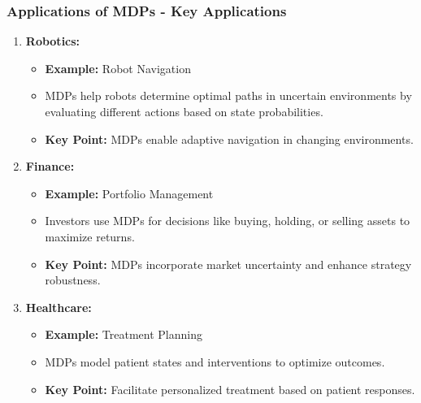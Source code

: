 \documentclass[aspectratio=169]{beamer}
\begin{document}
\begin{frame}[fragile]
    \frametitle{Applications of MDPs - Key Applications}
    \begin{enumerate}
        \item \textbf{Robotics:}
            \begin{itemize}
                \item \textbf{Example:} Robot Navigation
                \item MDPs help robots determine optimal paths in uncertain environments by evaluating different actions based on state probabilities.
                \item \textbf{Key Point:} MDPs enable adaptive navigation in changing environments.
            \end{itemize}

        \item \textbf{Finance:}
            \begin{itemize}
                \item \textbf{Example:} Portfolio Management
                \item Investors use MDPs for decisions like buying, holding, or selling assets to maximize returns.
                \item \textbf{Key Point:} MDPs incorporate market uncertainty and enhance strategy robustness.
            \end{itemize}

        \item \textbf{Healthcare:}
            \begin{itemize}
                \item \textbf{Example:} Treatment Planning
                \item MDPs model patient states and interventions to optimize outcomes.
                \item \textbf{Key Point:} Facilitate personalized treatment based on patient responses.
            \end{itemize}
    \end{enumerate}
\end{frame}
\end{document}
